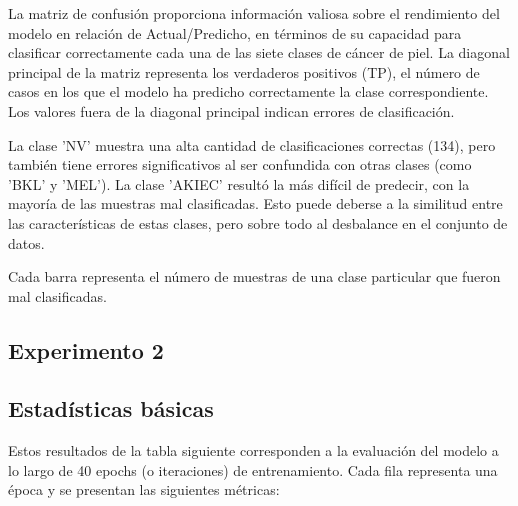 La matriz de confusión proporciona información valiosa sobre el rendimiento del modelo en relación de Actual/Predicho, en términos de su capacidad para clasificar correctamente cada una de las siete clases de cáncer de piel. La diagonal principal de la matriz representa los verdaderos positivos (TP), el número de casos en los que el modelo ha predicho correctamente la clase correspondiente. Los valores fuera de la diagonal principal indican errores de clasificación.

    La clase 'NV' muestra una alta cantidad de clasificaciones correctas (134), pero también tiene errores significativos al ser confundida con otras clases (como 'BKL' y 'MEL'). La clase 'AKIEC' resultó la más difícil de predecir, con la mayoría de las muestras mal clasificadas. Esto puede deberse a la similitud entre las características de estas clases, pero sobre todo al desbalance en el conjunto de datos.
    
    Cada barra representa el número de muestras de una clase particular que fueron mal clasificadas.
\subsection{Experimento 2}

\subsection{Estadísticas básicas}\label{sub:basic_statistics_p2}
    
    Estos resultados de la tabla siguiente corresponden a la evaluación del modelo a lo largo de 40 epochs (o iteraciones) de entrenamiento. Cada fila representa una época y se presentan las siguientes métricas:
    
